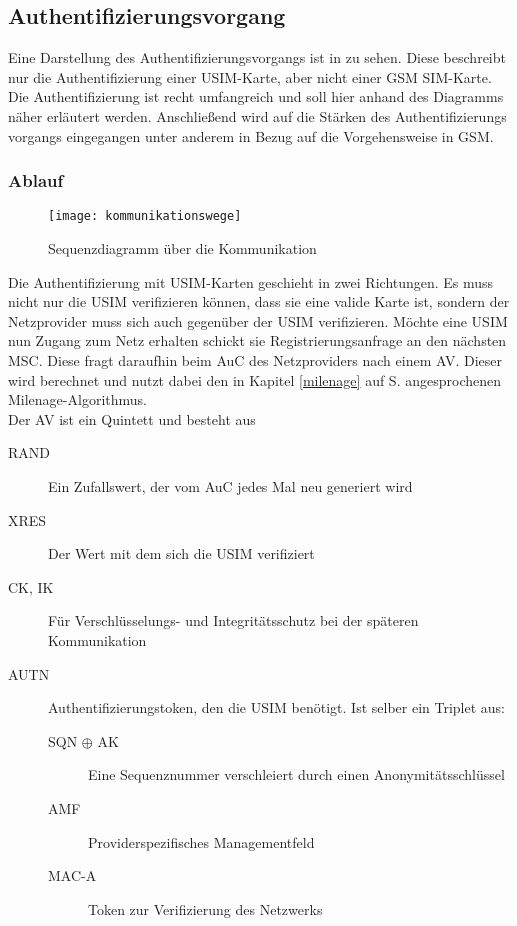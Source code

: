 \subsection{Authentifizierungsvorgang}
\label{authentifizierungsvorgang}

Eine Darstellung des Authentifizierungsvorgangs ist in  zu
sehen. Diese beschreibt nur die Authentifizierung einer \ac{USIM}-Karte, aber nicht einer
GSM \ac{SIM}-Karte. \\
Die Authentifizierung ist recht umfangreich und soll hier anhand des Diagramms näher
erläutert werden. Anschließend wird auf die Stärken des Authentifizierungs\-
vorgangs eingegangen unter anderem in Bezug auf die Vorgehensweise in GSM.

 \subsubsection{Ablauf}
 
 \begin{figure}[htp]
 \begin{center}
  \texttt{[image: kommunikationswege]}
 \end{center}
 \caption[Sequenzdiagramm über die Kommunikation zwischen SIM-Karte und Authentication Center]{Sequenzdiagramm über die Kommunikation}
 \label{fig:kommunikationswege}
\end{figure}

 Die Authentifizierung mit \ac{USIM}-Karten geschieht in zwei Richtungen. Es muss nicht nur die
 USIM verifizieren können, dass sie eine valide Karte ist, sondern der Netzprovider muss sich auch
 gegenüber der USIM verifizieren. Möchte eine USIM nun Zugang zum Netz erhalten schickt sie
 Registrierungsanfrage an den nächsten \ac{MSC}. Diese fragt daraufhin beim \ac{AuC} des
 Netzproviders nach einem \ac{AV}. Dieser wird berechnet und nutzt dabei den in Kapitel
 \ref{milenage} auf S. \pageref{milenage} angesprochenen Milenage-Algorithmus. \\
 Der AV ist ein Quintett und besteht aus
 
 \begin{description}
  \item [RAND] Ein Zufallswert, der vom AuC jedes Mal neu generiert wird
  \item [XRES] Der Wert mit dem sich die USIM verifiziert
  \item [CK, IK] Für Verschlüsselungs- und Integritätsschutz bei der späteren Kommunikation
  \item [AUTN] Authentifizierungstoken, den die USIM benötigt. Ist selber ein Triplet aus:
  \begin{description}
   \item [SQN $\oplus$ AK] Eine Sequenznummer verschleiert durch einen Anonymitätsschlüssel
   \item [AMF] Providerspezifisches Managementfeld
   \item [MAC-A] Token zur Verifizierung des Netzwerks
  \end{description}
 \end{description}
 
